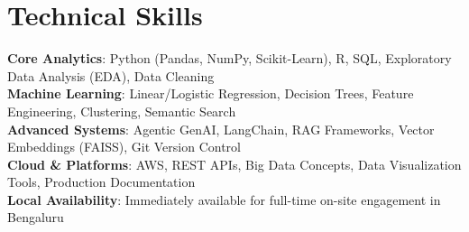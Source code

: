 \documentclass[letterpaper,11pt]{article}
\begin{document}
\section{Technical Skills}
  \vspace{-7pt}
  \begin{itemize}[leftmargin=0.15in, label={}]\small{\item{
    \textbf{Core Analytics}{: Python (Pandas, NumPy, Scikit-Learn), R, SQL, Exploratory Data Analysis (EDA), Data Cleaning} \\
    \textbf{Machine Learning}{: Linear/Logistic Regression, Decision Trees, Feature Engineering, Clustering, Semantic Search} \\
    \textbf{Advanced Systems}{: Agentic GenAI, LangChain, RAG Frameworks, Vector Embeddings (FAISS), Git Version Control} \\
    \textbf{Cloud \& Platforms}{: AWS, REST APIs, Big Data Concepts, Data Visualization Tools, Production Documentation} \\
    \textbf{Local Availability}{: Immediately available for full-time on-site engagement in Bengaluru}
  }}
  \end{itemize}
\end{document}
